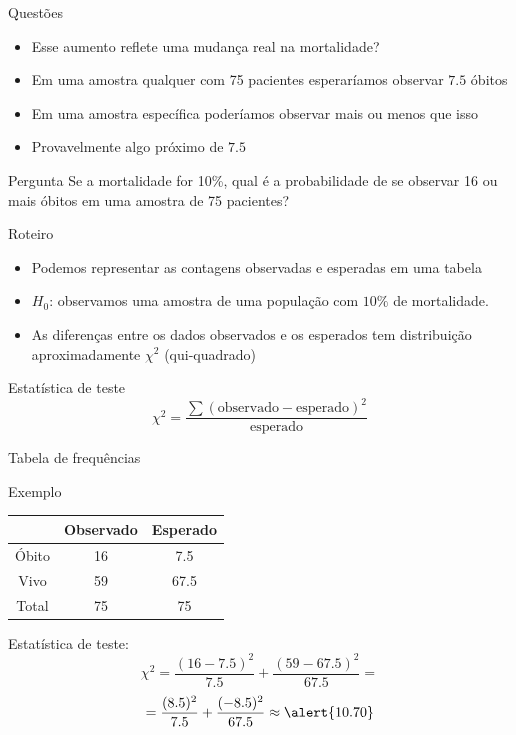 \documentclass{beamer}
\begin{document}
\begin{frame}{Questões}
  \begin{itemize}
  \item Esse aumento reflete uma mudança real na mortalidade?
  \item Em uma amostra qualquer com 75 pacientes esperaríamos observar $7.5$ óbitos
  \item Em uma amostra específica poderíamos observar mais ou menos
    que isso
  \item Provavelmente algo próximo de $7.5$
  \end{itemize}

  \begin{block}{Pergunta}
    Se a mortalidade for 10\%, qual é a probabilidade de se observar
    16 ou mais óbitos em uma amostra de 75 pacientes?
  \end{block}
\end{frame}

\begin{frame}{Roteiro}
  \begin{itemize}
    \small
  \item Podemos representar as contagens observadas e esperadas em uma tabela
  \item $H_0$: \alert{observamos uma amostra de uma população com
      $10\%$ de mortalidade}.
  \item As diferenças entre os dados observados e os esperados tem
    distribuição aproximadamente $\chi^2$ (qui-quadrado)
  \end{itemize}
  \begin{block}{Estatística de teste}
    $$\chi^2 = \frac{\sum (\text{observado} - \text{esperado})^2 }{\text{esperado}}$$
  \end{block}
\end{frame}

\begin{frame}{Tabela de frequências}
  \begin{exampleblock}{Exemplo}
    \begin{tabular}{c|c|c}
      & Observado & Esperado\\
      \hline
      Óbito & 16 & 7.5 \\
      \hline
      Vivo & 59 & 67.5 \\
      \hline
      Total & 75 & 75\\
    \end{tabular}
  \end{exampleblock}

Estatística de teste:
  \begin{displaymath}
    \chi^2 = \frac{(16 - 7.5)^2}{7.5} + \frac{(59 - 67.5)^2}{67.5} =
  \end{displaymath}
  \begin{displaymath}
    = \frac{(8.5)^2}{7.5} + \frac{(-8.5)^2}{67.5} \approx \alert{10.70}
  \end{displaymath}
\end{frame}
\end{document}
